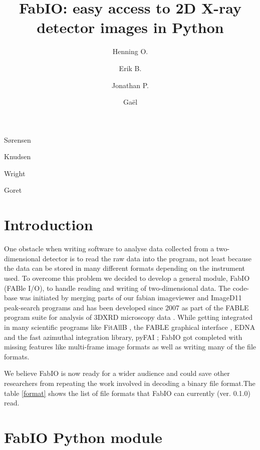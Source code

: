 \documentclass[preprint ]{iucr}
\begin{document}
\title{FabIO: easy access to 2D X-ray detector images in Python}

    \author[a]{Henning O.}{S{\o}rensen}
    \author[b]{Erik B.}{Knudsen}
    \author[c]{Jonathan P.}{Wright}
	\author[c]{Ga\"el}{Goret}

\maketitle

\section{Introduction}

One obstacle when writing software to analyse data collected from a
two-dimensional detector is to read the raw data into the program,
not least because the data can be stored in many different formats
depending on the instrument used.
To overcome this problem we decided to develop a general module,
FabIO (FABle I/O), to handle reading and writing of two-dimensional
data.
The code-base was initiated by merging parts of our fabian imageviewer
\cite{fabian} and ImageD11 \cite{ImageD11} peak-search programs and has
been developed since 2007 as part of the FABLE \cite{fable} program suite
for analysis of 3DXRD microscopy data \cite{3dxrd}.
While getting integrated in many scientific programs like FitAllB
\cite{fitallb}, the FABLE graphical interface \cite{fable}, EDNA \cite{edna} and
the fast azimuthal integration library, pyFAI \cite{pyfai}; FabIO got
completed with missing features like multi-frame image formats as well as
writing many of the file formats.

We believe FabIO is now ready for a wider audience and could save other
researchers from repeating the work involved in decoding a
binary file format.The table \ref{format} shows the list of file formats that
FabIO can currently (ver. 0.1.0) read.


\section{FabIO Python module}
\end{document}
